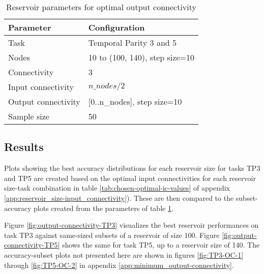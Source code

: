 \begin{table}[ht]
    \centering
    \caption{Reservoir parameters for optimal output connectivity}
    \label{tab:oc-reservoir-parameters}
    \begin{tabular}{ll}
        \hline
        \textbf{Parameter} & \textbf{Configuration} \\
        \hline
        \hline
        Task                & Temporal Parity 3 and 5        \\
        Nodes               & 10 to (100, 140), step size=10 \\
        Connectivity        & 3                              \\
        Input connectivity  & $ n\_nodes / 2 $               \\
        Output connectivity & [0..n\_nodes], step size=10    \\
        Sample size         & 50 \\
        \hline
    \end{tabular}
\end{table}

\subsection{Results}

Plots showing the best accuracy distributions for each reservoir size for tasks TP3 and TP5 are created based on the optimal input connectivities for each reservoir size-task combination in table \ref{tab:chosen-optimal-ic-values} of appendix \ref{app:reservoir_size-input_connectivity}).
These are then compared to the subset-accuracy plots created from the parameters of table \ref{tab:oc-reservoir-parameters}.

Figure \ref{fig:output-connectivity-TP3} visualizes the best reservoir performances on task TP3 against same-sized subsets of a reservoir of size 100.
Figure \ref{fig:output-connectivity-TP5} shows the same for task TP5, up to a reservoir size of 140.
The accuracy-subset plots not presented here are shown in figures \ref{fig:TP3-OC-1} through \ref{fig:TP5-OC-2} in appendix \ref{app:minimum_output-connectivity}.

\begin{figure*}[ht]
    \centering
    \caption{
        N-sized reservoir to subset comparison plots for task TP3 up to a reservoir size of 100.
        N-subset performance is practically identical to a same-sized reservoir.
        Subfigure \ref{fig:output-connectivity-TP3-composite} shows best n-sized reservoir performance,
        while subfigure \ref{fig:output-connectivity-TP3-subset} shows reservoir subset performance.
    }
    \label{fig:output-connectivity-TP3}
\end{figure*}

